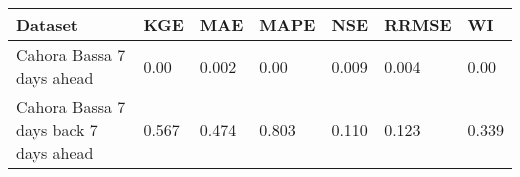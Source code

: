 \begin{tabular}{lllllll}
\toprule
                               Dataset &    KGE &    MAE &   MAPE &    NSE &  RRMSE &     WI \\
\midrule
            Cahora Bassa 7 days ahead  &   0.00 &  0.002 &   0.00 &  0.009 &  0.004 &   0.00 \\
 Cahora Bassa 7 days back 7 days ahead &  0.567 &  0.474 &  0.803 &  0.110 &  0.123 &  0.339 \\
\bottomrule
\end{tabular}

